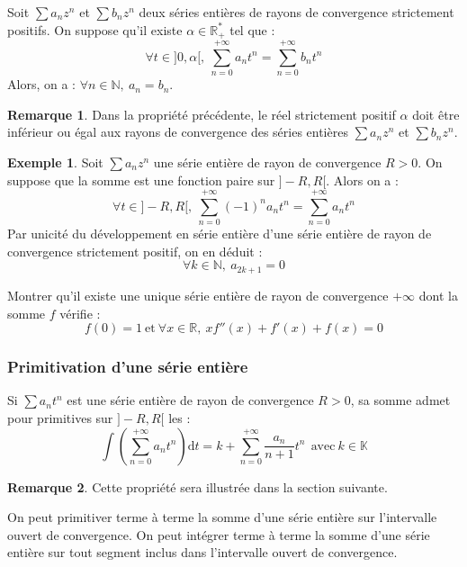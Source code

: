 \documentclass[french]{article}
\newcommand{\N}{\mathbb{N}}
\newcommand{\R}{\mathbb{R}}
\newcommand{\K}{\mathbb{K}}
\newcommand{\st}{^*}
\renewcommand{\d}{\text{d}}
\theoremstyle{plain}
\theoremstyle{definition}
\newtheorem*{ex}{Exemple}
\newtheorem*{rmq}{Remarque}
\theoremstyle{remark}
\begin{document}
\begin{prop}%
	Soit $\displaystyle\sum a_nz^n$ et $\displaystyle\sum b_nz^n$ deux séries entières de rayons de convergence strictement positifs. On suppose qu'il existe $\alpha\in\R_+\st$ tel que : $$\forall t\in]0,\alpha[,\ \sum_{n=0}^{+\infty}a_nt^n=\sum_{n=0}^{+\infty}b_nt^n$$ Alors, on a : $\forall n\in\N,\  a_n=b_n$.
\end{prop}

\begin{rmq}
	Dans la propriété précédente, le réel strictement positif $\alpha$ doit être inférieur ou égal aux rayons de convergence des séries entières $\displaystyle\sum a_nz^n$ et $\displaystyle\sum b_nz^n$.
\end{rmq}

\begin{ex}
	Soit $\displaystyle\sum a_nz^n$ une série entière de rayon de convergence $R>0$. On suppose que la somme est une fonction paire sur $]-R,R[$. Alors on a : $$\forall t\in]-R,R[,\ \sum_{n=0}^{+\infty}(-1)^na_nt^n=\sum_{n=0}^{+\infty}a_nt^n$$ Par unicité du développement en série entière d'une série entière de rayon de convergence strictement positif, on en déduit : $$\forall k\in\N,\ a_{2k+1}=0$$
\end{ex}

\begin{exo}
	Montrer qu'il existe une unique série entière de rayon de convergence $+\infty$ dont la somme $f$ vérifie : $$f(0)=1\ \text{et}\ \forall x\in\R,\ xf''(x)+f'(x)+f(x)=0$$
\end{exo}

\subsubsection*{Primitivation d'une série entière}

\begin{prop}
	Si $\displaystyle\sum a_nt^n$ est une série entière de rayon de convergence $R>0$, sa somme admet pour primitives sur $]-R,R[$ les : $$\int\left(\sum_{n=0}^{+\infty}a_nt^n\right)\d t=k+\sum_{n=0}^{+\infty}\frac{a_n}{n+1}t^n\ \ \text{avec}\ k\in\K$$
\end{prop}

\begin{rmq}
	Cette propriété sera illustrée dans la section suivante.
\end{rmq}

\begin{met}
	On peut primitiver terme à terme la somme d'une série entière sur l'intervalle ouvert de convergence. On peut intégrer terme à terme la somme d'une série entière sur tout segment inclus dans l'intervalle ouvert de convergence.
\end{met}
\end{document}
